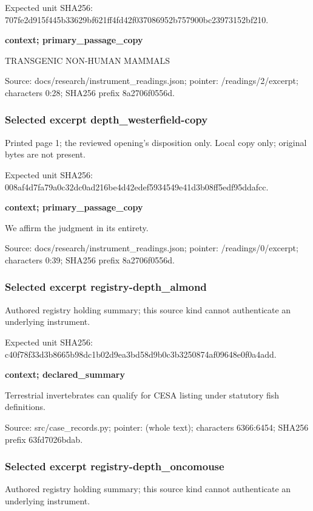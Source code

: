 \documentclass[
  english,
]{article}
\begin{document}
Expected unit SHA256:
707fe2d915f445b33629bf621ff4fd42f037086952b757900bc23973152bf210.

\textbf{context; primary\_passage\_copy}

TRANSGENIC NON-HUMAN MAMMALS

Source: docs/research/instrument\_readings.json; pointer:
/readings/2/excerpt; characters 0:28; SHA256 prefix 8a2706f0556d.

\subsubsection{Selected excerpt
depth\_westerfield-copy}\label{selected-excerpt-depth_westerfield-copy}

Printed page 1; the reviewed opening's disposition only. Local copy
only; original bytes are not present.

Expected unit SHA256:
008af4d7fa79a0c32dc0ad216be4d42edef5934549e41d3b08ff5edf95ddafcc.

\textbf{context; primary\_passage\_copy}

We affirm the judgment in its entirety.

Source: docs/research/instrument\_readings.json; pointer:
/readings/0/excerpt; characters 0:39; SHA256 prefix 8a2706f0556d.

\subsubsection{Selected excerpt
registry-depth\_almond}\label{selected-excerpt-registry-depth_almond}

Authored registry holding summary; this source kind cannot authenticate
an underlying instrument.

Expected unit SHA256:
c40f78f33d3b8665b98dc1b02d9ea3bd58d9b0c3b3250874af09648e0f0a4add.

\textbf{context; declared\_summary}

Terrestrial invertebrates can qualify for CESA listing under statutory
fish definitions.

Source: src/case\_records.py; pointer: (whole text); characters
6366:6454; SHA256 prefix 63fd7026bdab.

\subsubsection{Selected excerpt
registry-depth\_oncomouse}\label{selected-excerpt-registry-depth_oncomouse}

Authored registry holding summary; this source kind cannot authenticate
an underlying instrument.
\end{document}
